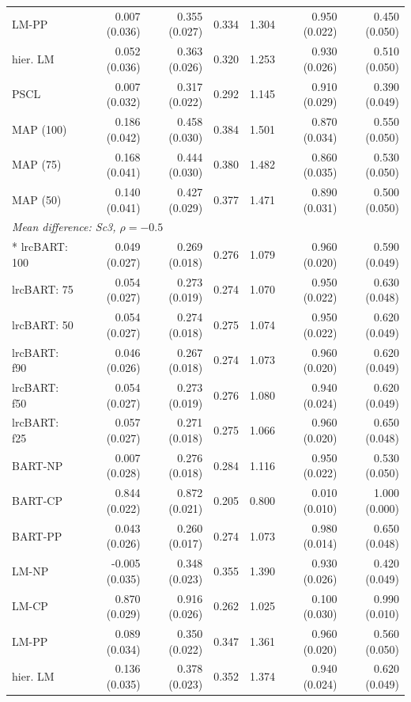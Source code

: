 \begin{landscape}
\begin{longtable}{lrrrrrr}
LM-PP & 0.007 (0.036) & 0.355 (0.027) & 0.334 & 1.304 & 0.950 (0.022) & 0.450 (0.050) \\
hier. LM & 0.052 (0.036) & 0.363 (0.026) & 0.320 & 1.253 & 0.930 (0.026) & 0.510 (0.050) \\
PSCL & 0.007 (0.032) & 0.317 (0.022) & 0.292 & 1.145 & 0.910 (0.029) & 0.390 (0.049) \\
MAP (100) & 0.186 (0.042) & 0.458 (0.030) & 0.384 & 1.501 & 0.870 (0.034) & 0.550 (0.050) \\
MAP (75) & 0.168 (0.041) & 0.444 (0.030) & 0.380 & 1.482 & 0.860 (0.035) & 0.530 (0.050) \\
MAP (50) & 0.140 (0.041) & 0.427 (0.029) & 0.377 & 1.471 & 0.890 (0.031) & 0.500 (0.050) \\
\multicolumn{7}{l}{\strut\textit{Mean difference: Sc3, $\rho=-0.5$}}\\*
lrcBART: 100 & 0.049 (0.027) & 0.269 (0.018) & 0.276 & 1.079 & 0.960 (0.020) & 0.590 (0.049) \\
lrcBART: 75 & 0.054 (0.027) & 0.273 (0.019) & 0.274 & 1.070 & 0.950 (0.022) & 0.630 (0.048) \\
lrcBART: 50 & 0.054 (0.027) & 0.274 (0.018) & 0.275 & 1.074 & 0.950 (0.022) & 0.620 (0.049) \\
lrcBART: f90 & 0.046 (0.026) & 0.267 (0.018) & 0.274 & 1.073 & 0.960 (0.020) & 0.620 (0.049) \\
lrcBART: f50 & 0.054 (0.027) & 0.273 (0.019) & 0.276 & 1.080 & 0.940 (0.024) & 0.620 (0.049) \\
lrcBART: f25 & 0.057 (0.027) & 0.271 (0.018) & 0.275 & 1.066 & 0.960 (0.020) & 0.650 (0.048) \\
BART-NP & 0.007 (0.028) & 0.276 (0.018) & 0.284 & 1.116 & 0.950 (0.022) & 0.530 (0.050) \\
BART-CP & 0.844 (0.022) & 0.872 (0.021) & 0.205 & 0.800 & 0.010 (0.010) & 1.000 (0.000) \\
BART-PP & 0.043 (0.026) & 0.260 (0.017) & 0.274 & 1.073 & 0.980 (0.014) & 0.650 (0.048) \\
LM-NP & -0.005 (0.035) & 0.348 (0.023) & 0.355 & 1.390 & 0.930 (0.026) & 0.420 (0.049) \\
LM-CP & 0.870 (0.029) & 0.916 (0.026) & 0.262 & 1.025 & 0.100 (0.030) & 0.990 (0.010) \\
LM-PP & 0.089 (0.034) & 0.350 (0.022) & 0.347 & 1.361 & 0.960 (0.020) & 0.560 (0.050) \\
hier. LM & 0.136 (0.035) & 0.378 (0.023) & 0.352 & 1.374 & 0.940 (0.024) & 0.620 (0.049) \\

\end{longtable}
\end{landscape}
